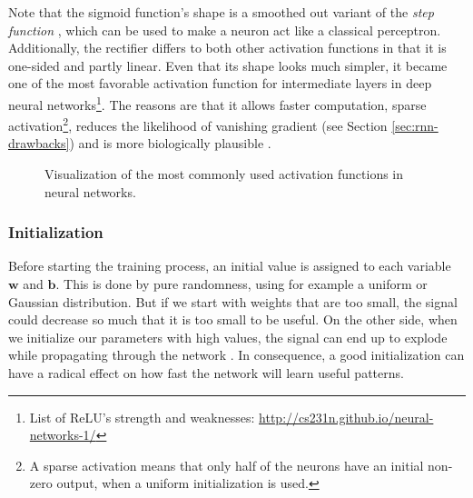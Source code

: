 Note that the sigmoid function's shape is a smoothed out variant of the \textit{step function} \parencite{neural_nets_deep_learning}, which can be used to make a neuron act like a classical perceptron. Additionally, the rectifier differs to both other activation functions in that it is one-sided and partly linear. Even that its shape looks much simpler, it became one of the most favorable activation function for intermediate layers in deep neural networks\footnote{List of ReLU's strength and weaknesses: \url{http://cs231n.github.io/neural-networks-1/}}. The reasons are that it allows faster computation, sparse activation\footnote{{A sparse activation means that only half of the neurons have an initial non-zero output, when a uniform initialization is used.}}, reduces the likelihood of vanishing gradient (see Section \ref{sec:rnn-drawbacks}) and is more biologically plausible \parencite{relu}.

\begin{figure}[htpb]
  \centering
  \hspace*{-1.0cm}
  {
  }
  \caption[Activation Functions]{Visualization of the most commonly used activation functions in neural networks.}\label{fig:activations}
\end{figure}

\subsubsection{Initialization}

Before starting the training process, an initial value is assigned to each variable $ \textbf{w} $ and $ \textbf{b} $. This is done by pure randomness, using for example a uniform or Gaussian distribution. But if we start with weights that are too small, the signal could decrease so much that it is too small to be useful. On the other side, when we initialize our parameters with high values, the signal can end up to explode while propagating through the network \parencite{understand_xavier}. In consequence, a good initialization can have a radical effect on how fast the network will learn useful patterns.

